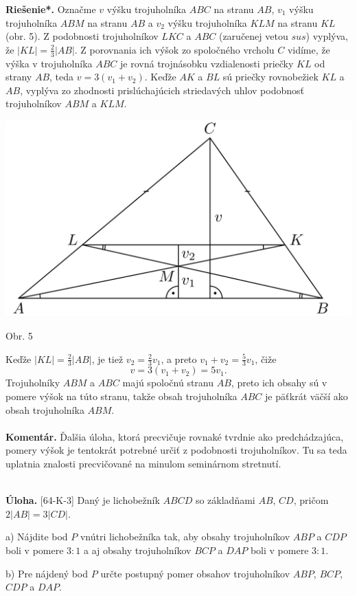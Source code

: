 \documentclass[11pt,a4paper,oneside,final]{book}
\newcommand{\kom}{\textbf{Komentár.} }
\newcommand{\ul}{\textbf{Úloha.} }
\newcommand{\rieh}{\textbf{Riešenie*.} }
\begin{document}
\rieh Označme $v$ výšku trojuholníka $ABC$ na stranu $AB$, $v_1$ výšku trojuholníka $ABM$ na stranu $AB$ a $v_2$ výšku trojuholníka $KLM$ na stranu $KL$ (obr. 5). Z podobnosti trojuholníkov $LKC$ a $ABC$ (zaručenej vetou $sus$) vyplýva, že $|KL| =\frac{2}{3} |AB|$. Z porovnania ich výšok zo spoločného vrcholu $C$ vidíme, že výška v trojuholníka $ABC$ je rovná trojnásobku vzdialenosti priečky $KL$ od strany $AB$, teda $v = 3(v_1 +v_2)$. Keďže $AK$ a $BL$ sú priečky rovnobežiek $KL$ a $AB$, vyplýva zo zhodnosti prislúchajúcich striedavých uhlov podobnosť trojuholníkov $ABM$ a $KLM$.
\begin{center}
\includegraphics{64S2}

Obr. 5
\end{center}
Keďže $|KL| =\frac{2}{3}|AB|$, je tiež $v_2 =\frac{2}{3}v_1$, a preto $v_1 + v_2 =\frac{5}{3}v_1$, čiže
$$v = 3(v_1 + v_2) = 5v_1.$$
Trojuholníky $ABM$ a $ABC$ majú spoločnú stranu $AB$, preto ich obsahy sú v pomere výšok na túto stranu, takže obsah trojuholníka $ABC$ je päťkrát väčší ako obsah trojuholníka $ABM$.\\
\\
\kom Ďalšia úloha, ktorá precvičuje rovnaké tvrdnie ako predchádzajúca, pomery výšok je tentokrát potrebné určiť z podobnosti trojuholníkov. Tu sa teda uplatnia znalosti precvičované na minulom seminárnom stretnutí. \\
\\
\begin{tcolorbox}[breakable,notitle,boxrule=0pt,colback=light-gray,colframe=light-gray]\ul [64-K-3]  Daný je lichobežník $ABCD$ so základňami $AB$, $CD$, pričom $2|AB| = 3|CD|$.

a) Nájdite bod $P$ vnútri lichobežníka tak, aby obsahy trojuholníkov $ABP$ a $CDP$ boli v pomere $3 : 1$ a aj obsahy trojuholníkov $BCP$ a $DAP$ boli v pomere $3 : 1$.

b) Pre nájdený bod $P$ určte postupný pomer obsahov trojuholníkov $ABP$, $BCP$, $CDP$ a $DAP$.

\end{tcolorbox}
\end{document}
